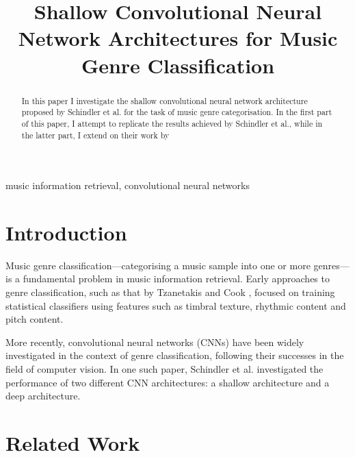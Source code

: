 \documentclass[conference]{IEEEtran}
\begin{document}
\title{Shallow Convolutional Neural Network Architectures for Music Genre Classification}

\author{
}

\maketitle

\begin{abstract}
In this paper I investigate the shallow convolutional neural network architecture proposed by Schindler et al. \cite{SchindlerLidyRauber} for the task of music genre categorisation.
In the first part of this paper, I attempt to replicate the results achieved by Schindler et al., while in the latter part, I extend on their work by 
\end{abstract}

\begin{IEEEkeywords}
music information retrieval, convolutional neural networks
\end{IEEEkeywords}

\section{Introduction}

Music genre classification---categorising a music sample into one or more genres---is a fundamental problem in music information retrieval.
Early approaches to genre classification, such as that by Tzanetakis and Cook \cite{TzanetakisCook}, focused on training statistical classifiers using features such as timbral texture, rhythmic content and pitch content.

More recently, convolutional neural networks (CNNs) have been widely investigated in the context of genre classification, following their successes in the field of computer vision.
In one such paper, Schindler et al. \cite{SchindlerLidyRauber} investigated the performance of two different CNN architectures: a shallow architecture and a deep architecture.

\section{Related Work}
\end{document}
